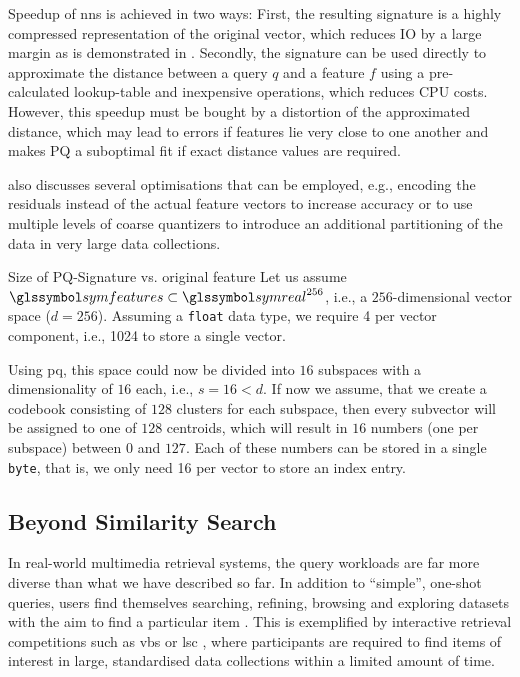 Speedup of \acrshort{nns} is achieved in two ways: First, the resulting signature is a highly compressed representation of the original vector, which reduces IO by a large margin as is demonstrated in . Secondly, the signature can be used directly to approximate the distance between a query $q$ and a feature $f$ using a pre-calculated lookup-table and inexpensive operations, which reduces CPU costs. However, this speedup must be bought by a distortion of the approximated distance, which may lead to errors if features lie very close to one another and makes PQ a suboptimal fit if exact distance values are required.

\cite{Jegou:2010Product} also discusses several optimisations that can be employed, e.g., encoding the residuals instead of the actual feature vectors to increase accuracy or to use multiple levels of coarse quantizers to introduce an additional partitioning of the data in very large data collections.

\begin{example}[label=example:pq_compression]{Size of PQ-Signature vs. original feature}{}
    Let us assume $\symfeatures \subset \symreal^{256}$, i.e., a $256$-dimensional vector space ($d = 256$). Assuming a \texttt{float} data type, we require \SI{4}{\byte} per vector component, i.e., \SI{1024}{\byte} to store a single vector.
    
    Using \acrshort{pq}, this space could now be divided into $16$ subspaces with a dimensionality of $16$ each, i.e., $s = 16 < d$. If now we assume, that we create a codebook consisting of $128$ clusters for each subspace, then every subvector will be assigned to one of $128$ centroids, which will result in $16$ numbers (one per subspace) between $0$ and $127$. Each of these numbers can be stored in a single \texttt{byte}, that is, we only need \SI{16}{\byte} per vector to store an index entry.
\end{example}

\subsection{Beyond Similarity Search}
In real-world multimedia retrieval systems, the query workloads are far more diverse than what we have described so far. In addition to ``simple'', one-shot queries, users find themselves searching, refining, browsing and exploring datasets with the aim to find a particular item \cite{Lokovc:2019Interactive,Rossetto:2020Interactive}. This is exemplified by interactive retrieval competitions such as \acrfull{vbs} \cite{Schoeffmann:2019Video,Lokovc:2018Influential} or \acrfull{lsc} \cite{Gurrin:2021Introduction}, where participants are required to find items of interest in large, standardised data collections \cite{Berns:2019V3C1,Rossetto:2021Insights} within a limited amount of time.

